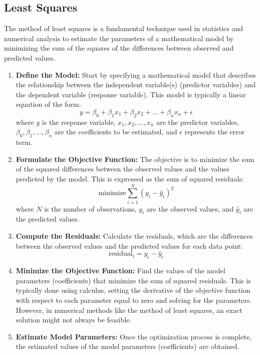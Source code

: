 \documentclass{article}
\begin{document}
\subsection{Least Squares}
The method of least squares is a fundamental technique used in statistics and numerical analysis to estimate the parameters of a mathematical model by minimizing the sum of the squares of the differences between observed and predicted values.
\begin{enumerate}
    \item \textbf{Define the Model:} Start by specifying a mathematical model that describes the relationship between the independent variable(s) (predictor variables) and the dependent variable (response variable). This model is typically a linear equation of the form:
    \[ y = \beta_0 + \beta_1 x_1 + \beta_2 x_2 + \ldots + \beta_n x_n + \epsilon \]
    where \( y \) is the response variable, \( x_1, x_2, \ldots, x_n \) are the predictor variables, \( \beta_0, \beta_1, \ldots, \beta_n \) are the coefficients to be estimated, and \( \epsilon \) represents the error term.
    
    \item \textbf{Formulate the Objective Function:} The objective is to minimize the sum of the squared differences between the observed values and the values predicted by the model. This is expressed as the sum of squared residuals:
    \[ \text{minimize} \sum_{i=1}^{N} (y_i - \hat{y}_i)^2 \]
    where \( N \) is the number of observations, \( y_i \) are the observed values, and \( \hat{y}_i \) are the predicted values.
    
    \item \textbf{Compute the Residuals:} Calculate the residuals, which are the differences between the observed values and the predicted values for each data point:
    \[ \text{residual}_i = y_i - \hat{y}_i \]
    
    \item \textbf{Minimize the Objective Function:} Find the values of the model parameters (coefficients) that minimize the sum of squared residuals. This is typically done using calculus, setting the derivative of the objective function with respect to each parameter equal to zero and solving for the parameters. However, in numerical methods like the method of least squares, an exact solution might not always be feasible.
    

    
    \item \textbf{Estimate Model Parameters:} Once the optimization process is complete, the estimated values of the model parameters (coefficients) are obtained.





\end{enumerate}
\end{document}
